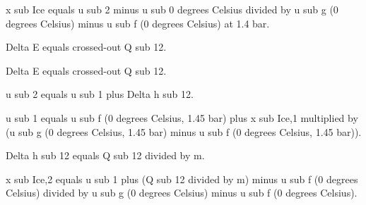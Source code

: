 x sub Ice equals u sub 2 minus u sub 0 degrees Celsius divided by u sub g (0 degrees Celsius) minus u sub f (0 degrees Celsius) at 1.4 bar.  

Delta E equals crossed-out Q sub 12.  

Delta E equals crossed-out Q sub 12.  

u sub 2 equals u sub 1 plus Delta h sub 12.  

u sub 1 equals u sub f (0 degrees Celsius, 1.45 bar) plus x sub Ice,1 multiplied by (u sub g (0 degrees Celsius, 1.45 bar) minus u sub f (0 degrees Celsius, 1.45 bar)).  

Delta h sub 12 equals Q sub 12 divided by m.  

x sub Ice,2 equals u sub 1 plus (Q sub 12 divided by m) minus u sub f (0 degrees Celsius) divided by u sub g (0 degrees Celsius) minus u sub f (0 degrees Celsius).